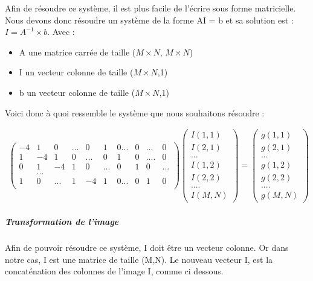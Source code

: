 Afin de résoudre ce système, il est plus facile de l'écrire sous forme matricielle. Nous devons donc résoudre un système de la forme AI = b et sa solution est  :  $I = A^{-1}\times b$.
Avec : 
\begin{itemize}
\item A une matrice carrée de taille ($M\times N$, $M\times N$)
\item I un vecteur colonne de taille ($M\times N$,1)
\item b un vecteur colonne de taille ($M\times N$,1)
\end{itemize}
Voici donc à quoi ressemble le système que nous souhaitons résoudre :
\begin{center}

\begin{equation}
\left.
\begin{aligned}
\begin{pmatrix}
	-4 & 1 & 0 & ...& 0 & 1 & 0...&0& ... & 0\\
	1 & -4 & 1 & 0 & ... & 0 &1 &0&....&0\\
	0 & 1 & -4 & 1 & 0&... &0 &1 &0&...\\
	&...\\
	1 & 0 &... &1 &-4 &1 &0...& 0& 1 & 0\\
\end{pmatrix}
\begin{pmatrix}
I(1,1)\\
I(2,1)\\
...\\
I(1,2)\\
I(2,2)\\
....\\
I(M, N)
\end{pmatrix}
= 
\begin{pmatrix}
g(1,1)\\
g(2,1)\\
...\\
g(1,2)\\
g(2,2)\\
....\\
g(M, N)
\end{pmatrix}
\end{aligned}
\right.
\end{equation}
\end{center}

\subparagraph{Transformation de l'image}
Afin de pouvoir résoudre ce système, I doit être un vecteur colonne. Or dans notre cas, I est une matrice de taille (M,N). Le nouveau vecteur I, est la concaténation des colonnes de l'image I, comme ci dessous.


